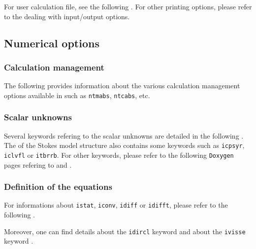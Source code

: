 For user calculation file, see the following . For other printing options, please refer to the
 dealing with input/output options.

\subsection{Numerical options}
\subsubsection{Calculation management}

The following 
provides information about the various calculation management options available
in \CS such as \texttt{ntmabs}, \texttt{ntcabs}, etc.

\subsubsection{Scalar unknowns}

Several keywords refering to the scalar unknowns are
detailed in the following
. The 
of the Stokes model structure also contains some keywords such as \texttt{icpsyr},
\texttt{iclvfl} or \texttt{itbrrb}.
For other keywords, please refer to the following \texttt{Doxygen} pages refering to
 and
.

\subsubsection{Definition of the equations}

For informations about \texttt{istat}, \texttt{iconv}, \texttt{idiff}
or \texttt{idifft}, please refer to the following
.

Moreover, one can find details about the \texttt{idircl} keyword
 and about the
\texttt{ivisse} keyword .

